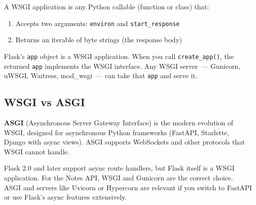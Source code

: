 A WSGI application is any Python callable (function or class) that:

\begin{enumerate}
\def\labelenumi{\arabic{enumi}.}
\tightlist
\item
  Accepts two arguments: \texttt{environ} and \texttt{start\_response}
\item
  Returns an iterable of byte strings (the response body)
\end{enumerate}

\begin{codebox}[short]

\begin{Shaded}
\begin{Highlighting}[]
\OperatorTok{=} 
\OperatorTok{=}\NormalTok{ [(}\NormalTok{, }\NormalTok{)]}
    \NormalTok{ [}\NormalTok{]}
\end{Highlighting}
\end{Shaded}

\end{codebox}

\noindent{}Flask's \texttt{app} object is a WSGI application. When you call \texttt{create\_app()}, the returned \texttt{app} implements the WSGI interface. Any WSGI server~--- Gunicorn, uWSGI, Waitress, mod\_wsgi~--- can take that \texttt{app} and serve it.

\subsection*{WSGI vs ASGI}\label{24-process-startup:wsgi-vs-asgi}

\textbf{ASGI} (Asynchronous Server Gateway Interface) is the modern evolution of WSGI, designed for asynchronous Python frameworks (FastAPI, Starlette, Django with async views). ASGI supports WebSockets and other protocols that WSGI cannot handle.

Flask 2.0 and later support async route handlers, but Flask itself is a WSGI application. For the Notes API, WSGI and Gunicorn are the correct choice. ASGI and servers like Uvicorn or Hypercorn are relevant if you switch to FastAPI or use Flask's async features extensively.

